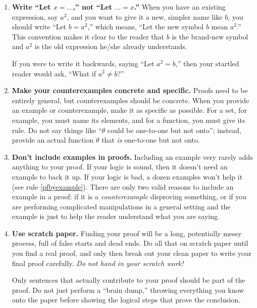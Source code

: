 \begin{enumerate}
\item \textbf{Write ``Let $x=\dots$,'' not ``Let $\dots=x$.''} 
	When you have an existing expression, say $a^{2}$,
	and you want to give it a new, simpler name like $b$,
	you should write ``Let $b=a^{2}$,''
	which means, ``Let the new symbol $b$ mean $a^{2}$.''
	This convention makes it clear to the reader that $b$ is the brand-new symbol
	and $a^{2}$ is the old expression he/she already understands.
	
	If you were to write it backwards, saying ``Let $a^{2}=b$,''
	then your startled reader would ask,
	``What if $a^{2}\neq b$?''
  
\item \textbf{Make your counterexamples concrete and specific.}
	Proofs need to be entirely general,
	but counterexamples should be concrete.
	When you provide an example or counterexample,
	make it as specific as possible.
	For a set, for example, you must name its elements,
	and for a function, you must give its rule.
	Do not say things like ``$\theta$ could be one-to-one but not onto'';
	instead, provide an actual function $\theta$ that \emph{is} one-to-one but not onto.
    
\item \textbf{Don't include examples in proofs.}
	Including an example very rarely adds anything to your proof.
	If your logic is sound, then it doesn't need an example to back it up.
	If your logic is bad, a dozen examples won't help it (see rule \ref{pfbyexample}).
	There are only two valid reasons to include an example in a proof:
	if it is a \emph{counterexample} disproving something,
	or if you are performing complicated manipulations in a general setting
	and the example is just to help the reader understand what you are saying.

 \item \textbf{Use scratch paper.}
	Finding your proof will be a long, potentially messy process, 
	full of false starts and dead ends.
	Do all that on scratch paper
	until you find a real proof,
	and only then break out your clean paper to write your final proof carefully.
	\emph{Do not hand in your scratch work!}
	
	Only sentences that actually contribute to your proof 
	should be part of the proof.
	Do not just perform a ``brain dump,''
	throwing everything you know onto the paper
	before showing the logical steps that prove the conclusion.
	

\end{enumerate}
